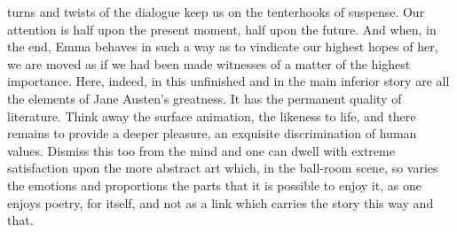 turns and twists of the dialogue keep us on the tenterhooks of suspense. Our attention is half upon the present moment, half upon the future. And when, in the end, Emma behaves in such a way as to vindicate our highest hopes of her, we are moved as if we had been made witnesses of a matter of the highest importance. Here, indeed, in this unfinished and in the main inferior story are all the elements of Jane Austen's greatness. It has the permanent quality of literature. Think away the surface animation, the likeness to life, and there remains to provide a deeper pleasure, an exquisite discrimination of human values. Dismiss this too from the mind and one can dwell with extreme satisfaction upon the more abstract art which, in the ball-room scene, so varies the emotions and proportions the parts that it is possible to enjoy it, as one enjoys poetry, for itself, and not as a link which carries the story this way and that.

